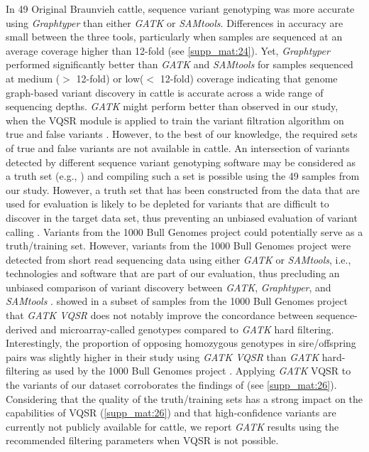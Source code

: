 \documentclass[../main.tex]{subfiles}
\begin{document}
In 49 Original Braunvieh cattle, sequence variant genotyping was more accurate using \emph{Graphtyper} than either \emph{GATK} or \emph{SAMtools}. Differences in accuracy are small between the three tools, particularly when samples are sequenced at an average coverage higher than 12-fold (see \ref{supp_mat:24}). Yet, \emph{Graphtyper} performed significantly better than \emph{GATK} and \emph{SAMtools} for samples sequenced at medium ($>$ 12-fold) or low($<$ 12-fold)
coverage indicating that genome graph-based variant discovery in cattle is accurate across a wide range of sequencing depths. \emph{GATK} might perform better than observed in our study, when the VQSR module is applied to train the variant filtration algorithm on true and false variants \citep{pirooznia2014validation}. However, to the best of our knowledge, the required sets of true and false variants are not available in cattle. An intersection of variants detected by different sequence variant genotyping software may be considered as a truth set (e.g., \citet{alberto2018convergent}) and compiling such a set is possible using the 49 samples from our study. However, a truth set that has been constructed from the data that are used for evaluation is likely to be depleted for variants that are difficult to discover in the target data set, thus preventing an unbiased evaluation of variant calling \citep{li2018synthetic}. Variants from the 1000 Bull Genomes project \citep{Daetwyler2014,Hayes2019} could potentially serve as a truth/training set. However, variants from the 1000 Bull Genomes project were detected from short read sequencing data using either \emph{GATK} or \emph{SAMtools}, i.e., technologies and software that are part of our evaluation, thus precluding an unbiased comparison of variant discovery between \emph{GATK}, \emph{Graphtyper}, and \emph{SAMtools} \citep{li2018synthetic}. \citet{vander2018best} showed in a subset of samples from the 1000 Bull Genomes project that \emph{GATK VQSR} does not notably improve the concordance between sequence-derived and microarray-called genotypes compared to \emph{GATK} hard filtering. Interestingly, the proportion of opposing homozygous genotypes in sire/offspring pairs was slightly higher in their study using \emph{GATK VQSR} than \emph{GATK} hard-filtering as used by the 1000 Bull Genomes project \citep{vander2018best}. Applying \emph{GATK} VQSR to the variants of our dataset corroborates the findings of \citet{vander2018best} (see \ref{supp_mat:26}). Considering that the quality of the truth/training sets has a strong impact on the capabilities of VQSR (\ref{supp_mat:26}) and that high-confidence variants are currently not publicly available for cattle, we report \emph{GATK} results using the recommended filtering parameters when VQSR is not possible.
\end{document}

